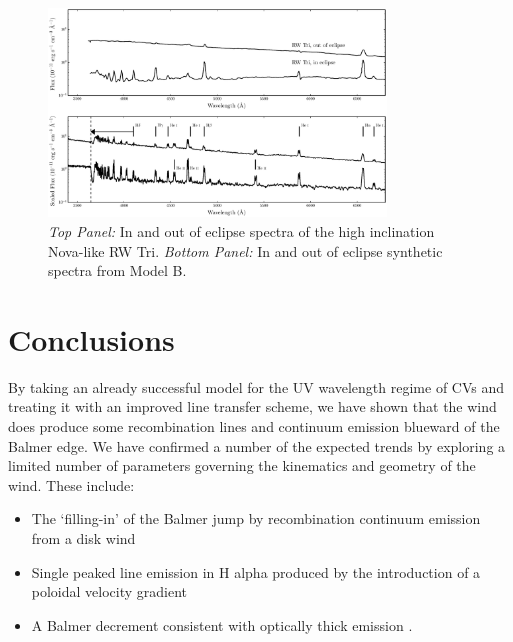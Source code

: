 \documentclass[preprint, a4paper, 11pt]{aastex}
\begin{document}
\begin{figure} %
\includegraphics[width=0.8\textwidth]{figures/fig13_eclipse.eps}
\caption{{\sl Top Panel:} In and out of eclipse spectra of the high
inclination Nova-like RW Tri. {\sl Bottom Panel:} In and out of eclipse synthetic
spectra from Model B.}
\label{rwtricomp}
\end{figure} %




\newpage
%
%


\section{Conclusions}

By taking an already successful model
for the UV wavelength regime of CVs and treating 
it with an improved line transfer scheme, we have shown
that the wind does produce some recombination lines
and continuum emission blueward of the Balmer edge.
We have confirmed a number of the expected trends
by exploring a limited number of parameters governing the
kinematics and geometry of the wind. These include:

\renewcommand{\labelitemi}{$\bullet$}
\begin{itemize}
	\item The `filling-in' of the Balmer jump \citep{elitzur1983} by recombination 
	continuum emission from a disk wind
	\item Single peaked line emission in H alpha produced by 
	the introduction of a poloidal velocity gradient \citep{MC96}
	\item A Balmer decrement consistent with optically thick emission \citep{elitzur1983}.
\end{itemize}
\smallskip
\end{document}
